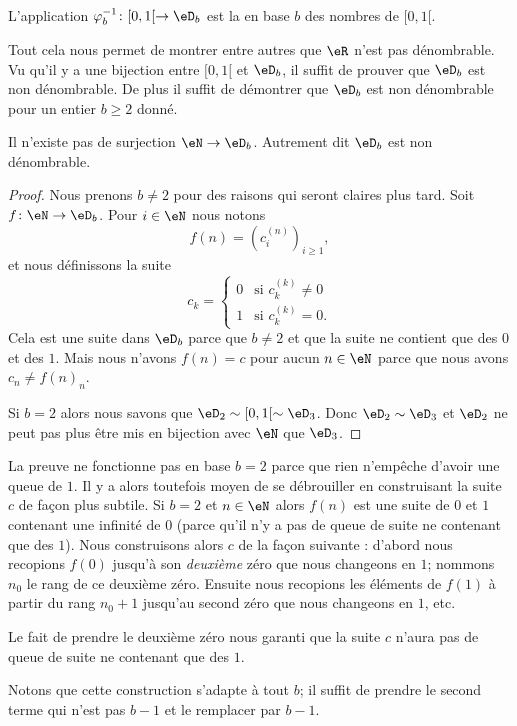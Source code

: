 L'application \( \varphi_b^{-1}\colon \mathopen[ 0 , 1 [\to \eD_b\) est la  en base \( b\) des nombres de \( \mathopen[ 0 , 1 [\).

Tout cela nous permet de montrer entre autres que \( \eR\) n'est pas dénombrable. Vu qu'il y a une bijection entre \( \mathopen[ 0 , 1 [\) et \( \eD_b\), il suffit de prouver que \( \eD_b\) est non dénombrable. De plus il suffit de démontrer que \( \eD_b\) est non dénombrable pour un entier \( b\geq 2\) donné.

\begin{proposition}  \label{PropNNHooYTVFw} 
    Il n'existe pas de surjection \( \eN\to \eD_b\). Autrement dit \( \eD_b\) est non dénombrable.
\end{proposition}

\begin{proof}
    Nous prenons \( b\neq 2\) pour des raisons qui seront claires plus tard. Soit \( f\colon \eN\to \eD_b\). Pour \( i\in \eN\) nous notons 
    \begin{equation}
        f(n)=(c_i^{(n)})_{i\geq 1},
    \end{equation}
    et nous définissons la suite
    \begin{equation}
        c_k=\begin{cases}
            0    &   \text{si } c_k^{(k)}\neq 0\\
            1    &    \text{si } c_k^{(k)}=0.
        \end{cases}
    \end{equation}
    Cela est une suite dans \( \eD_b\) parce que \( b\neq 2\) et que la suite ne contient que des \( 0\) et des \( 1\). Mais nous n'avons \( f(n)=c\) pour aucun \( n\in \eN\) parce que nous avons \( c_n\neq f(n)_n\).

    Si \( b=2\) alors nous savons que \( \eD_2\sim\mathopen[ 0 , 1 [\sim \eD_3\). Donc \( \eD_2\sim \eD_3\) et \( \eD_2\) ne peut pas plus être mis en bijection avec \( \eN\) que \( \eD_3\).
\end{proof}
\begin{remark}
    La preuve ne fonctionne pas en base \( b=2\) parce que rien n'empêche d'avoir une queue de \( 1\). Il y a alors toutefois moyen de se débrouiller en construisant la suite \( c\) de façon plus subtile. Si \( b=2\) et \( n\in \eN\) alors \( f(n)\) est une suite de \( 0\) et \( 1\) contenant une infinité de \( 0\) (parce qu'il n'y a pas de queue de suite ne contenant que des \( 1\)). Nous construisons alors \( c\) de la façon suivante : d'abord nous recopions \( f(0)\) jusqu'à son \emph{deuxième} zéro que nous changeons en \( 1\); nommons \( n_0\) le rang de ce deuxième zéro. Ensuite nous recopions les éléments de \( f(1) \) à partir du rang \( n_0+1\) jusqu'au second zéro que nous changeons en \( 1\), etc.

    Le fait de prendre le deuxième zéro nous garanti que la suite \( c\) n'aura pas de queue de suite ne contenant que des \( 1\).

    Notons que cette construction s'adapte à tout \( b\); il suffit de prendre le second terme qui n'est pas \( b-1\) et le remplacer par \( b-1\).
\end{remark}

